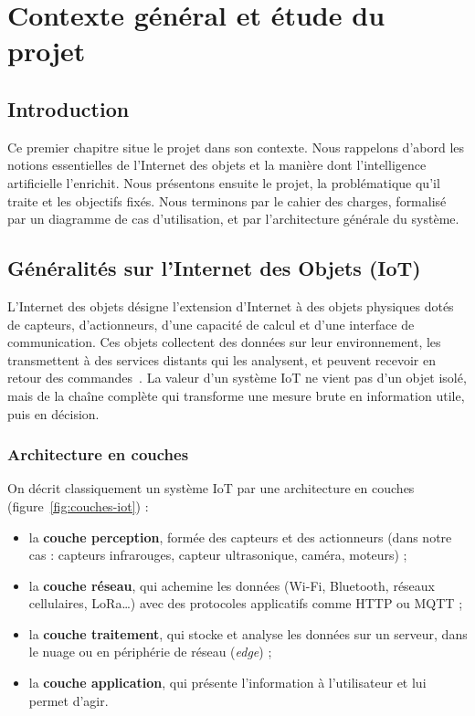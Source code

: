 \chapter{Contexte général et étude du projet}

\section{Introduction}
Ce premier chapitre situe le projet dans son contexte. Nous rappelons d'abord les notions essentielles de
l'Internet des objets et la manière dont l'intelligence artificielle l'enrichit. Nous présentons ensuite le projet,
la problématique qu'il traite et les objectifs fixés. Nous terminons par le cahier des charges, formalisé par un
diagramme de cas d'utilisation, et par l'architecture générale du système.

\section{Généralités sur l'Internet des Objets (IoT)}

L'Internet des objets désigne l'extension d'Internet à des objets physiques dotés de capteurs, d'actionneurs, d'une
capacité de calcul et d'une interface de communication. Ces objets collectent des données sur leur
environnement, les transmettent à des services distants qui les analysent, et peuvent recevoir en retour des
commandes~\cite{atzori2010,alfuqaha2015}. La valeur d'un système IoT ne vient pas d'un objet isolé, mais de la
chaîne complète qui transforme une mesure brute en information utile, puis en décision.

\subsection*{Architecture en couches}
On décrit classiquement un système IoT par une architecture en couches (figure~\ref{fig:couches-iot}) :
\begin{itemize}
  \item la \textbf{couche perception}, formée des capteurs et des actionneurs (dans notre cas : capteurs
        infrarouges, capteur ultrasonique, caméra, moteurs) ;
  \item la \textbf{couche réseau}, qui achemine les données (Wi-Fi, Bluetooth, réseaux cellulaires, LoRa…) avec des
        protocoles applicatifs comme HTTP ou MQTT ;
  \item la \textbf{couche traitement}, qui stocke et analyse les données sur un serveur, dans le nuage ou en
        périphérie de réseau (\textit{edge}) ;
  \item la \textbf{couche application}, qui présente l'information à l'utilisateur et lui permet d'agir.
\end{itemize}

